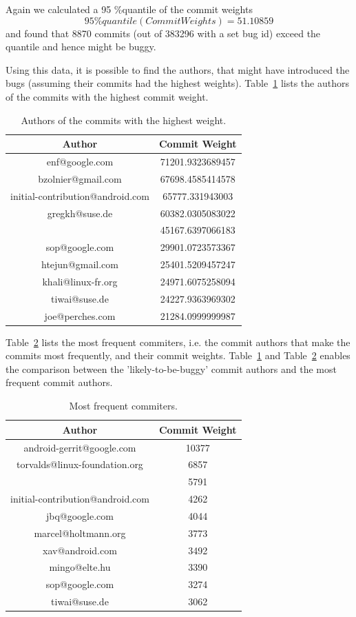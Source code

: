 \documentclass[a4paper,11pt]{article}
\begin{document}
Again we calculated a 95 \%quantile of the commit weights
\[95\%quantile(CommitWeights) = 51.10859\] and found that 8870 commits (out of 383296 with a set bug id) exceed the quantile and  hence might be buggy.

Using this data, it is possible to find the authors, that might have introduced the bugs (assuming their commits had the highest weights). Table~\ref{tbl:bad_authors} lists the authors of the commits with the highest commit weight.

\begin{table}[ht!]
\centering
\begin{tabular}{|c|c|}
\hline
Author & Commit Weight\tabularnewline
\hline
\hline
enf@google.com & 71201.9323689457\tabularnewline
\hline
bzolnier@gmail.com & 67698.4585414578\tabularnewline
\hline
initial-contribution@android.com & 65777.331943003\tabularnewline
\hline
gregkh@suse.de & 60382.0305083022\tabularnewline
\hline
 & 45167.6397066183\tabularnewline
\hline
sop@google.com & 29901.0723573367\tabularnewline
\hline
htejun@gmail.com & 25401.5209457247\tabularnewline
\hline
khali@linux-fr.org & 24971.6075258094\tabularnewline
\hline
tiwai@suse.de & 24227.9363969302\tabularnewline
\hline
joe@perches.com & 21284.0999999987\tabularnewline
\hline
\end{tabular}
\caption{Authors of the commits with the highest weight.}
\label{tbl:bad_authors}
\end{table}

Table~\ref{tbl:fast_authors} lists the most frequent commiters, i.e. the commit authors that make the commits most frequently, and their commit weights. Table~\ref{tbl:bad_authors} and Table~\ref{tbl:fast_authors} enables the comparison between the 'likely-to-be-buggy' commit authors and the most frequent commit authors.

\begin{table}[ht!]
\centering
\begin{tabular}{|c|c|}
\hline
Author & Commit Weight\tabularnewline
\hline
\hline
android-gerrit@google.com & 10377\tabularnewline
\hline
torvalds@linux-foundation.org & 6857\tabularnewline
\hline
 & 5791\tabularnewline
\hline
initial-contribution@android.com & 4262\tabularnewline
\hline
jbq@google.com & 4044\tabularnewline
\hline
marcel@holtmann.org & 3773\tabularnewline
\hline
xav@android.com & 3492\tabularnewline
\hline
mingo@elte.hu & 3390\tabularnewline
\hline
sop@google.com & 3274\tabularnewline
\hline
tiwai@suse.de & 3062\tabularnewline
\hline
\hline
\end{tabular}
\caption{Most frequent commiters.}
\label{tbl:fast_authors}
\end{table}
\end{document}
